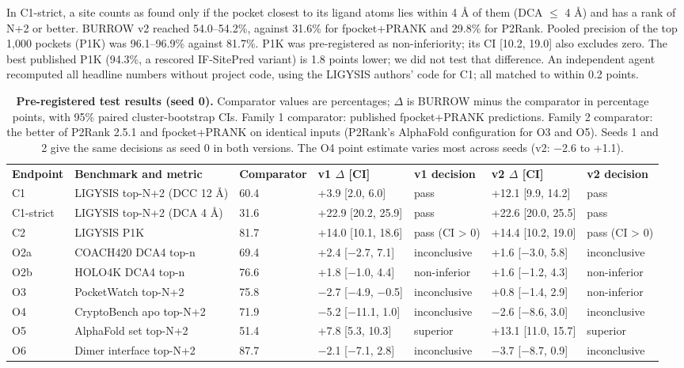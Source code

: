 \documentclass[10pt,letterpaper]{article}
\newlength\savedwidth
\newcommand\thickhline{\noalign{\global\savedwidth\arrayrulewidth\global\arrayrulewidth 2pt}%
\hline
\noalign{\global\arrayrulewidth\savedwidth}}
\begin{document}
In C1-strict, a site counts as found only if the pocket closest to its ligand atoms lies within 4 \AA{} of them (DCA $\le$ 4 \AA{}) and has a rank of N+2 or better. BURROW v2 reached 54.0--54.2\%, against 31.6\% for fpocket+PRANK and 29.8\% for P2Rank. Pooled precision of the top 1,000 pockets (P1K) was 96.1--96.9\% against 81.7\%. P1K was pre-registered as non-inferiority; its CI [10.2, 19.0] also excludes zero. The best published P1K (94.3\%, a rescored IF-SitePred variant) is 1.8 points lower; we did not test that difference. An independent agent recomputed all headline numbers without project code, using the LIGYSIS authors' code for C1; all matched to within 0.2 points.

\begin{table}[!ht]
\begin{adjustwidth}{-0.0in}{0in}
\centering
\caption{{\bf Pre-registered test results (seed 0).} Comparator values are percentages; $\Delta$ is BURROW minus the comparator in percentage points, with 95\% paired cluster-bootstrap CIs. Family 1 comparator: published fpocket+PRANK predictions. Family 2 comparator: the better of P2Rank 2.5.1 and fpocket+PRANK on identical inputs (P2Rank's AlphaFold configuration for O3 and O5). Seeds 1 and 2 give the same decisions as seed 0 in both versions. The O4 point estimate varies most across seeds (v2: $-$2.6 to +1.1).}
\label{table_prereg}
{\footnotesize
\begin{tabular}{p{1.4cm}p{2.8cm}p{1.6cm}p{2.3cm}p{1.8cm}p{2.3cm}p{1.8cm}}
\hline
\textbf{Endpoint} & \textbf{Benchmark and metric} & \textbf{Comparator} & \textbf{v1 $\Delta$ [CI]} & \textbf{v1 decision} & \textbf{v2 $\Delta$ [CI]} & \textbf{v2 decision} \\ \thickhline
C1 & LIGYSIS top-N+2 (DCC 12 \AA{}) & 60.4 & +3.9 [2.0, 6.0] & pass & +12.1 [9.9, 14.2] & pass \\ \hline
C1-strict & LIGYSIS top-N+2 (DCA 4 \AA{}) & 31.6 & +22.9 [20.2, 25.9] & pass & +22.6 [20.0, 25.5] & pass \\ \hline
C2 & LIGYSIS P1K & 81.7 & +14.0 [10.1, 18.6] & pass (CI \textgreater{} 0) & +14.4 [10.2, 19.0] & pass (CI \textgreater{} 0) \\ \hline
O2a & COACH420 DCA4 top-n & 69.4 & +2.4 [$-$2.7, 7.1] & inconclusive & +1.6 [$-$3.0, 5.8] & inconclusive \\ \hline
O2b & HOLO4K DCA4 top-n & 76.6 & +1.8 [$-$1.0, 4.4] & non-inferior & +1.6 [$-$1.2, 4.3] & non-inferior \\ \hline
O3 & PocketWatch top-N+2 & 75.8 & $-$2.7 [$-$4.9, $-$0.5] & inconclusive & +0.8 [$-$1.4, 2.9] & non-inferior \\ \hline
O4 & CryptoBench apo top-N+2 & 71.9 & $-$5.2 [$-$11.1, 1.0] & inconclusive & $-$2.6 [$-$8.6, 3.0] & inconclusive \\ \hline
O5 & AlphaFold set top-N+2 & 51.4 & +7.8 [5.3, 10.3] & superior & +13.1 [11.0, 15.7] & superior \\ \hline
O6 & Dimer interface top-N+2 & 87.7 & $-$2.1 [$-$7.1, 2.8] & inconclusive & $-$3.7 [$-$8.7, 0.9] & inconclusive \\ \hline
\end{tabular}}
\end{adjustwidth}
\end{table}
\end{document}
